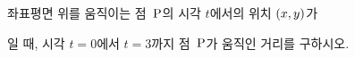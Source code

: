 \hspace*{2mm}\begin{minipage}[t]{\dimexpr\linewidth-2mm\relax}\vspace{0pt}
좌표평면 위를 움직이는 점~$\mathrm{P}$의 시각 $t$에서의 위치 $(x{,}\mkern3mu\mathopen{}y)$가 \par\smallskip{}\par\smallskip\noindent 일 때, 시각 $t=0$에서 $t=3$까지 점~$\mathrm{P}$가 움직인 거리를 구하시오.\end{minipage}
